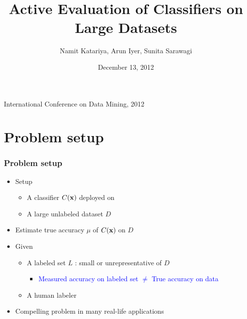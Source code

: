 \documentclass[usenames,dvipsnames, 11pt]{beamer}
\title[{\makebox[.45\paperwidth]{Active Evaluation of Classifiers\hfill%
       \insertframenumber/\inserttotalframenumber}}]{\textbf{Active Evaluation of Classifiers on Large Datasets}}
\author {Namit Katariya, Arun Iyer, Sunita Sarawagi}
\institute{IIT Bombay}
\date{December 13, 2012}
\newcommand{\vek}[1]{{\bf {#1}}}
\newcommand{\vx}{{\vek{x}}}
\newlength{\wideitemsep}
\let\olditem\item
\renewcommand{\item}{\setlength{\itemsep}{\wideitemsep}\olditem}
\begin{document}
\begin{frame}
\titlepage
\begin{center}
\large{International Conference on Data Mining, 2012} \\ \vspace*{10pt}
\end{center}
\end{frame}






\section{Problem setup}
\begin{frame}
\frametitle{Problem setup}
\pause
\begin{itemize}
\item Setup
  \begin{itemize}
  \item A classifier $C(\vx)$ deployed on
  \item A large unlabeled dataset $D$
  \end{itemize}
  \pause
\item Estimate true accuracy $\mu$ of $C(\vx)$ on $D$
\pause
\item Given
  \begin{itemize}
\item A labeled set $L$ :  small or unrepresentative of $D$ 
\begin{itemize}
\item \textcolor{blue}{Measured accuracy on labeled set $\neq$ True accuracy on data}
\end{itemize}
\item A human labeler
\end{itemize}
\item Compelling problem in many real-life applications
\end{itemize}
\end{frame}
\end{document}
